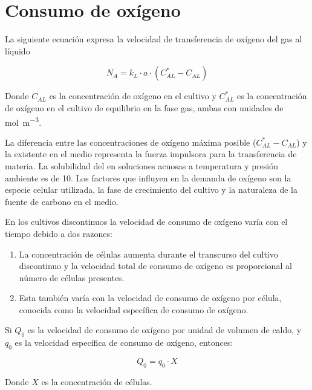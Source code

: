 \documentclass{AsignaturaResumen}
\begin{document}
\section{Consumo de oxígeno}

La siguiente ecuación expresa la velocidad de transferencia de oxígeno del gas al líquido

\begin{equation}
    N_{A} = k_{L} \cdot a \cdot (C_{AL}^{\ast} - C_{AL})
\end{equation}

Donde $C_{AL}$ es la concentración de oxígeno en el cultivo y $C_{AL}^{\ast}$ es la concentración de oxígeno en el cultivo de equilibrio en la fase gas, ambas con unidades de \unit{\mole\per\m\cubed}. 


La diferencia entre las concentraciones de oxígeno máxima posible ($C_{AL}^{\ast} - C_{AL}$) y la existente en el medio representa la fuerza impulsora para la transferencia de materia. La solubilidad del  en soluciones acuosas a temperatura y presión ambiente es de \qty{10}{\ppm}. Los factores que influyen en la demanda de oxígeno son la especie celular utilizada, la fase de crecimiento del cultivo y la naturaleza de la fuente de carbono en el medio. 

En los cultivos discontinuos la velocidad de consumo de oxígeno varía con el tiempo debido a dos razones:

\begin{enumerate}
    \item La concentración de células aumenta durante el transcurso del cultivo discontinuo y la velocidad total de consumo de oxígeno es proporcional al número de células presentes.
    \item Esta también varía con la velocidad de consumo de oxígeno por célula, conocida como la velocidad específica de consumo de oxígeno.
\end{enumerate}

Si $Q_{0}$ es la velocidad de consumo de oxígeno por unidad de volumen de caldo, y $q_{0}$ es la velocidad específica de consumo de oxígeno, entonces:

\begin{equation}
    Q_{0} = q_{0} \cdot X
\end{equation}

Donde $X$ es la concentración de células.
\end{document}
